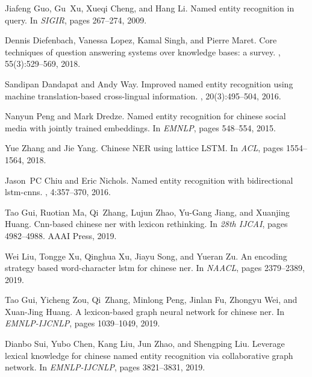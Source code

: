 \documentclass[conference]{IEEEtran}
\begin{document}
\begin{thebibliography}{00}

    Jiafeng Guo, Gu~Xu, Xueqi Cheng, and Hang Li.
    \newblock Named entity recognition in query.
    \newblock In {\em SIGIR}, pages 267--274, 2009.
    
    Dennis Diefenbach, Vanessa Lopez, Kamal Singh, and Pierre Maret.
    \newblock Core techniques of question answering systems over knowledge bases: a
      survey.
    , 55(3):529--569, 2018.
    
    Sandipan Dandapat and Andy Way.
    \newblock Improved named entity recognition using machine translation-based
      cross-lingual information.
    , 20(3):495--504, 2016.
    
    Nanyun Peng and Mark Dredze.
    \newblock Named entity recognition for chinese social media with jointly
      trained embeddings.
    \newblock In {\em EMNLP}, pages 548--554, 2015.
    
    Yue Zhang and Jie Yang.
    \newblock Chinese {NER} using lattice {LSTM}.
    \newblock In {\em ACL}, pages 1554--1564, 2018.
    
    Jason~PC Chiu and Eric Nichols.
    \newblock Named entity recognition with bidirectional lstm-cnns.
    , 4:357--370, 2016.
    
    Tao Gui, Ruotian Ma, Qi~Zhang, Lujun Zhao, Yu-Gang Jiang, and Xuanjing Huang.
    \newblock Cnn-based chinese ner with lexicon rethinking.
    \newblock In {\em 28th IJCAI}, pages 4982--4988. AAAI Press, 2019.
    
    Wei Liu, Tongge Xu, Qinghua Xu, Jiayu Song, and Yueran Zu.
    \newblock An encoding strategy based word-character lstm for chinese ner.
    \newblock In {\em NAACL}, pages 2379--2389, 2019.
    
    Tao Gui, Yicheng Zou, Qi~Zhang, Minlong Peng, Jinlan Fu, Zhongyu Wei, and
      Xuan-Jing Huang.
    \newblock A lexicon-based graph neural network for chinese ner.
    \newblock In {\em EMNLP-IJCNLP}, pages 1039--1049, 2019.
    
    Dianbo Sui, Yubo Chen, Kang Liu, Jun Zhao, and Shengping Liu.
    \newblock Leverage lexical knowledge for chinese named entity recognition via
      collaborative graph network.
    \newblock In {\em EMNLP-IJCNLP}, pages 3821--3831, 2019.
    

\end{thebibliography}
\end{document}

